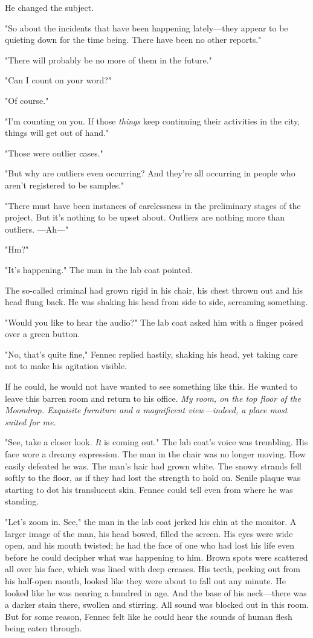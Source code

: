 He changed the subject.

"So about the incidents that have been happening lately---they appear to
be quieting down for the time being. There have been no other reports."

"There will probably be no more of them in the future."

"Can I count on your word?"

"Of course."

"I'm counting on you. If those \emph{things} keep continuing their activities
in the city, things will get out of hand."

"Those were outlier cases."

"But why are outliers even occurring? And they're all occurring in
people who aren't registered to be samples."

"There must have been instances of carelessness in the preliminary
stages of the project. But it's nothing to be upset about. Outliers are
nothing more than outliers. ---Ah---"

"Hm?"

"It's happening." The man in the lab coat pointed.

The so-called criminal had grown rigid in his chair, his chest thrown
out and his head flung back. He was shaking his head from side to side,
screaming something.

"Would you like to hear the audio?" The lab coat asked him with a finger
poised over a green button.

"No, that's quite fine," Fennec replied hastily, shaking his head, yet
taking care not to make his agitation visible.

If he could, he would not have wanted to see something like this. He
wanted to leave this barren room and return to his office. \emph{My room, on
the top floor of the Moondrop. Exquisite furniture and a magnificent
view---indeed, a place most suited for me.}

"See, take a closer look. \emph{It} is coming out." The lab coat's voice was
trembling. His face wore a dreamy expression. The man in the chair was
no longer moving. How easily defeated he was. The man's hair had grown
white. The snowy strands fell softly to the floor, as if they had lost
the strength to hold on. Senile plaque was starting to dot his
translucent skin. Fennec could tell even from where he was standing.

"Let's zoom in. See," the man in the lab coat jerked his chin at the
monitor. A larger image of the man, his head bowed, filled the screen.
His eyes were wide open, and his mouth twisted; he had the face of one
who had lost his life even before he could decipher what was happening
to him. Brown spots were scattered all over his face, which was lined
with deep creases. His teeth, peeking out from his half-open mouth,
looked like they were about to fall out any minute. He looked like he
was nearing a hundred in age. And the base of his neck---there was a
darker stain there, swollen and stirring. All sound was blocked out in
this room. But for some reason, Fennec felt like he could hear the
sounds of human flesh being eaten through.

